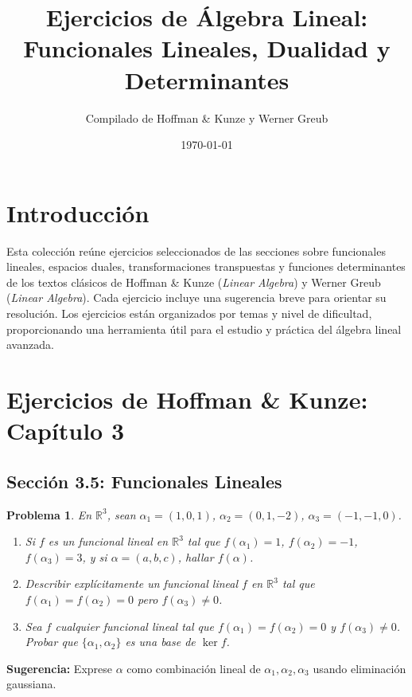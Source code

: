 \documentclass[12pt,a4paper]{article}
\title{Ejercicios de Álgebra Lineal: Funcionales Lineales, Dualidad y Determinantes}
\author{Compilado de Hoffman \& Kunze y Werner Greub}
\date{\today}
\newtheorem{problem}{Problema}
\newenvironment{suggestion}{\par\noindent\textbf{Sugerencia: }}{}
\begin{document}
\maketitle

\tableofcontents

\section*{Introducción}
Esta colección reúne ejercicios seleccionados de las secciones sobre funcionales lineales, espacios duales, transformaciones transpuestas y funciones determinantes de los textos clásicos de Hoffman \& Kunze (\emph{Linear Algebra}) y Werner Greub (\emph{Linear Algebra}). Cada ejercicio incluye una sugerencia breve para orientar su resolución. Los ejercicios están organizados por temas y nivel de dificultad, proporcionando una herramienta útil para el estudio y práctica del álgebra lineal avanzada.

\section{Ejercicios de Hoffman \& Kunze: Capítulo 3}

\subsection{Sección 3.5: Funcionales Lineales}

\begin{problem}
En $\mathbb{R}^3$, sean $\alpha_1 = (1,0,1)$, $\alpha_2 = (0,1,-2)$, $\alpha_3 = (-1,-1,0)$.
\begin{enumerate}
\item Si $f$ es un funcional lineal en $\mathbb{R}^3$ tal que $f(\alpha_1)=1$, $f(\alpha_2)=-1$, $f(\alpha_3)=3$, y si $\alpha = (a,b,c)$, hallar $f(\alpha)$.
\item Describir explícitamente un funcional lineal $f$ en $\mathbb{R}^3$ tal que $f(\alpha_1)=f(\alpha_2)=0$ pero $f(\alpha_3)\neq 0$.
\item Sea $f$ cualquier funcional lineal tal que $f(\alpha_1)=f(\alpha_2)=0$ y $f(\alpha_3)\neq 0$. Probar que $\{\alpha_1,\alpha_2\}$ es una base de $\ker f$.
\end{enumerate}
\end{problem}
\begin{suggestion}
Exprese $\alpha$ como combinación lineal de $\alpha_1,\alpha_2,\alpha_3$ usando eliminación gaussiana.
\end{suggestion}
\end{document}
